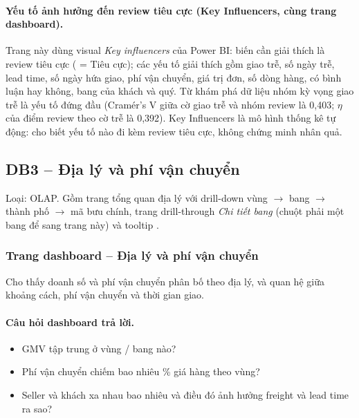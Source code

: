 \paragraph{Yếu tố ảnh hưởng đến review tiêu cực (Key Influencers, cùng trang dashboard).}

Trang này dùng visual \emph{Key influencers} của Power BI: biến cần giải thích là review tiêu cực ( = Tiêu cực); các yếu tố giải thích gồm giao trễ, số ngày trễ, lead time, số ngày hứa giao, phí vận chuyển, giá trị đơn, số dòng hàng, có bình luận hay không, bang của khách và quý. Từ khám phá dữ liệu nhóm kỳ vọng giao trễ là yếu tố đứng đầu (Cramér's V giữa cờ giao trễ và nhóm review là 0,403; $\eta$ của điểm review theo cờ trễ là 0,392). Key Influencers là mô hình thống kê tự động: cho biết yếu tố nào đi kèm review tiêu cực, không chứng minh nhân quả.


\subsection{DB3 -- Địa lý và phí vận chuyển}\label{sec:db3}
Loại: OLAP. Gồm trang tổng quan địa lý với drill-down vùng $\rightarrow$ bang $\rightarrow$ thành phố $\rightarrow$ mã bưu chính, trang drill-through \emph{Chi tiết bang} (chuột phải một bang để sang trang này) và tooltip .

\subsubsection*{Trang dashboard -- Địa lý và phí vận chuyển}

Cho thấy doanh số và phí vận chuyển phân bố theo địa lý, và quan hệ giữa khoảng cách, phí vận chuyển và thời gian giao.

\paragraph{Câu hỏi dashboard trả lời.}

\begin{itemize}
  \item GMV tập trung ở vùng / bang nào?
  \item Phí vận chuyển chiếm bao nhiêu \% giá hàng theo vùng?
  \item Seller và khách xa nhau bao nhiêu và điều đó ảnh hưởng freight và lead time ra sao?
\end{itemize}

